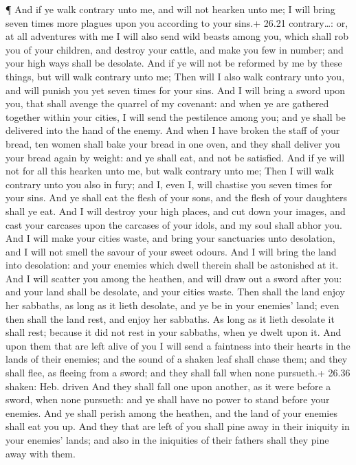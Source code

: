  ¶ And if ye walk contrary unto me, and will not hearken
unto me; I will bring seven times more plagues upon you according to
your sins.+ 26.21 contrary\ldots: or, at all adventures with me
 I will also send wild beasts among you, which shall rob
you of your children, and destroy your cattle, and make you few in
number; and your high ways shall be desolate.  And if ye
will not be reformed by me by these things, but will walk contrary unto
me;  Then will I also walk contrary unto you, and will
punish you yet seven times for your sins.  And I will bring
a sword upon you, that shall avenge the quarrel of my covenant: and when
ye are gathered together within your cities, I will send the pestilence
among you; and ye shall be delivered into the hand of the enemy.
 And when I have broken the staff of your bread, ten women
shall bake your bread in one oven, and they shall deliver you your bread
again by weight: and ye shall eat, and not be satisfied. 
And if ye will not for all this hearken unto me, but walk contrary unto
me;  Then I will walk contrary unto you also in fury; and
I, even I, will chastise you seven times for your sins. 
And ye shall eat the flesh of your sons, and the flesh of your daughters
shall ye eat.  And I will destroy your high places, and cut
down your images, and cast your carcases upon the carcases of your
idols, and my soul shall abhor you.  And I will make your
cities waste, and bring your sanctuaries unto desolation, and I will not
smell the savour of your sweet odours.  And I will bring
the land into desolation: and your enemies which dwell therein shall be
astonished at it.  And I will scatter you among the
heathen, and will draw out a sword after you: and your land shall be
desolate, and your cities waste.  Then shall the land enjoy
her sabbaths, as long as it lieth desolate, and ye be in your enemies'
land; even then shall the land rest, and enjoy her sabbaths.
 As long as it lieth desolate it shall rest; because it did
not rest in your sabbaths, when ye dwelt upon it.  And upon
them that are left alive of you I will send a faintness into their
hearts in the lands of their enemies; and the sound of a shaken leaf
shall chase them; and they shall flee, as fleeing from a sword; and they
shall fall when none pursueth.+ 26.36 shaken: Heb. driven 
And they shall fall one upon another, as it were before a sword, when
none pursueth: and ye shall have no power to stand before your enemies.
 And ye shall perish among the heathen, and the land of
your enemies shall eat you up.  And they that are left of
you shall pine away in their iniquity in your enemies' lands; and also
in the iniquities of their fathers shall they pine away with them.

